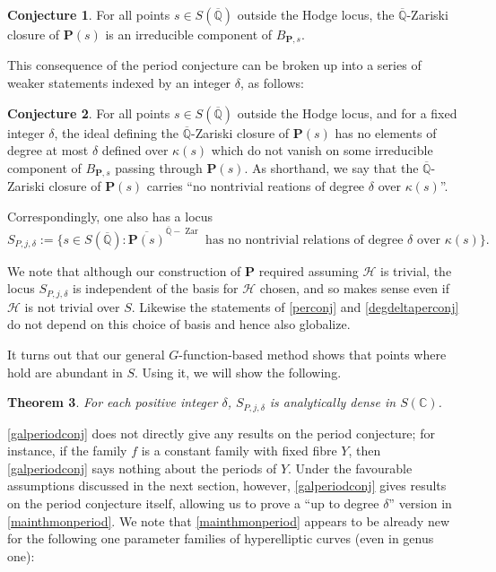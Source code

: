 \documentclass[10pt]{article}
\numberwithin{equation}{section}
\theoremstyle{plain}
\newtheorem{thm}{Theorem}[section]
\theoremstyle{definition}
\newtheorem{conj}[thm]{Conjecture}
\theoremstyle{remark}
\newcommand{\Qbar}{\overline{\mathbb{Q}}}
\begin{document}
\begin{conj}
\label{perconj}
For all points $s \in S(\Qbar)$ outside the Hodge locus, the $\Qbar$-Zariski closure of $\mathbf{P}(s)$ is an irreducible component of $B_{\mathbf{P},s}$. 
\end{conj}
\noindent This consequence of the period conjecture can be broken up into a series of weaker statements indexed by an integer $\delta$, as follows:
\begin{conj}\label{degdeltaperconj}
For all points $s \in S(\Qbar)$ outside the Hodge locus, and for a fixed integer $\delta$, the ideal defining the $\Qbar$-Zariski closure of $\mathbf{P}(s)$ has no elements of degree at most $\delta$ defined over $\kappa(s)$ which do not vanish on some irreducible component of $B_{\mathbf{P},s}$ passing through $\mathbf{P}(s)$. As shorthand, we say that the $\Qbar$-Zariski closure of $\mathbf{P}(s)$ carries ``no nontrivial reations of degree $\delta$ over $\kappa(s)$''.
\end{conj}
\noindent Correspondingly, one also has a locus
\[ S_{P,j,\delta} := \{ s \in S(\Qbar) : \overline{\mathbf{P}(s)}^{\Qbar-\operatorname{Zar}}\textrm{ has no nontrivial relations of degree }\delta\textrm{ over }\kappa(s) \} .  \]

\noindent We note that although our construction of $\mathbf{P}$ required assuming $\mathcal{H}$ is trivial, the locus $S_{P,j,\delta}$ is independent of the basis for $\mathcal{H}$ chosen, and so makes sense even if $\mathcal{H}$ is not trivial over $S$. Likewise the statements of \autoref{perconj} and \autoref{degdeltaperconj} do not depend on this choice of basis and hence also globalize.

It turns out that our general $G$-function-based method shows that points where  hold are abundant in $S$. Using it, we will show the following.

\begin{thm}\label{galperiodconj}
For each positive integer $\delta$, $S_{P,j,\delta}$ is analytically dense in $S(\mathbb{C})$.
\end{thm}

\autoref{galperiodconj} does not directly give any results on the period conjecture; for instance, if the family $f$ is a constant family with fixed fibre $Y$, then \autoref{galperiodconj} says nothing about the periods of $Y$. Under the favourable assumptions discussed in the next section, however, \autoref{galperiodconj} gives results on the period conjecture itself, allowing us to prove a ``up to degree $\delta$'' version in \autoref{mainthmonperiod}. We note that \autoref{mainthmonperiod} appears to be already new for the following one parameter families of hyperelliptic curves (even in genus one):
\end{document}
